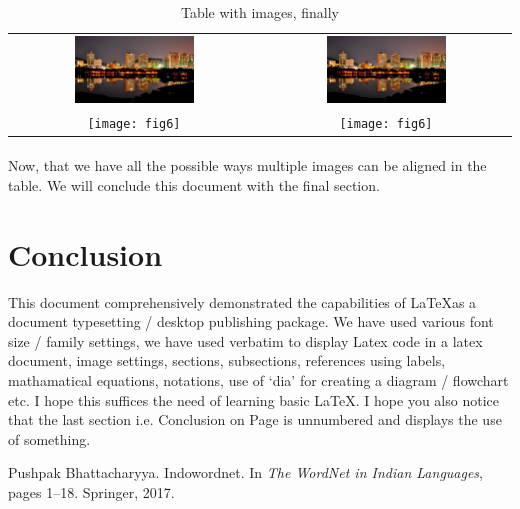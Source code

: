 \documentclass[titlepage,11pt,a4paper]{article}
\begin{document}
\begin{table}[H]
\caption{Table with images, finally}
\begin{tabular}{c c}
\includegraphics[width=0.5\textwidth]{fig5} & \includegraphics[width=0.5\textwidth]{fig5} \\
\texttt{[image: fig6]} & \texttt{[image: fig6]}
\end{tabular}
\end{table}

\paragraph{} Now, that we have all the possible ways multiple images can be aligned in the table. We will conclude this document with the final
section. 

\newpage

\section*{Conclusion} \label{end}
This document comprehensively demonstrated the capabilities of \LaTeX as a document typesetting / desktop publishing package. We have used various font size / family settings, we have used verbatim to display Latex code in a latex document, image settings, sections, subsections, references using labels, mathamatical equations, notations, use of ‘dia’ for creating a diagram / flowchart etc. I hope this suffices the need of learning basic \LaTeX. I hope you also notice that the last section i.e. Conclusion on Page \pageref{end} is unnumbered and displays the use of something.

\begin{thebibliography}{9}
Pushpak Bhattacharyya. Indowordnet. In \textit{The WordNet in Indian
Languages}, pages 1–18. Springer, 2017.
\end{thebibliography}
\end{document}
